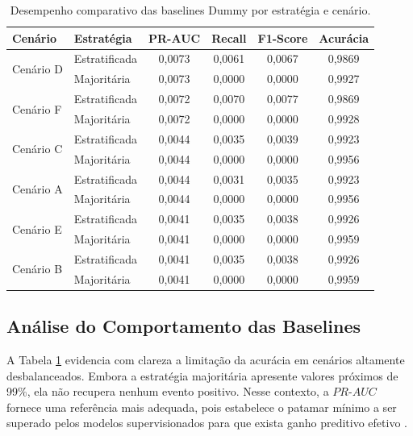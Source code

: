 \begin{table}[ht]
\centering
\caption{Desempenho comparativo das baselines Dummy por estratégia e cenário.}
\label{tab:resultados_dummies_completa}
\small
\begin{tabular}{llcccc}
\toprule
\textbf{Cenário} & \textbf{Estratégia} & \textbf{PR-AUC} & \textbf{Recall} & \textbf{F1-Score} & \textbf{Acurácia} \\
\midrule
\multirow{2}{*}{Cenário D} & Estratificada & 0,0073 & 0,0061 & 0,0067 & 0,9869 \\
                           & Majoritária   & 0,0073 & 0,0000 & 0,0000 & 0,9927 \\
\midrule
\multirow{2}{*}{Cenário F} & Estratificada & 0,0072 & 0,0070 & 0,0077 & 0,9869 \\
                           & Majoritária   & 0,0072 & 0,0000 & 0,0000 & 0,9928 \\
\midrule
\multirow{2}{*}{Cenário C} & Estratificada & 0,0044 & 0,0035 & 0,0039 & 0,9923 \\
                           & Majoritária   & 0,0044 & 0,0000 & 0,0000 & 0,9956 \\
\midrule
\multirow{2}{*}{Cenário A} & Estratificada & 0,0044 & 0,0031 & 0,0035 & 0,9923 \\
                           & Majoritária   & 0,0044 & 0,0000 & 0,0000 & 0,9956 \\
\midrule
\multirow{2}{*}{Cenário E} & Estratificada & 0,0041 & 0,0035 & 0,0038 & 0,9926 \\
                           & Majoritária   & 0,0041 & 0,0000 & 0,0000 & 0,9959 \\
\midrule
\multirow{2}{*}{Cenário B} & Estratificada & 0,0041 & 0,0035 & 0,0038 & 0,9926 \\
                           & Majoritária   & 0,0041 & 0,0000 & 0,0000 & 0,9959 \\
\bottomrule
\end{tabular}
\end{table}

\subsection{Análise do Comportamento das Baselines}

A Tabela \ref{tab:resultados_dummies_completa} evidencia com clareza a limitação da acurácia em cenários altamente desbalanceados. Embora a estratégia majoritária apresente valores próximos de 99\%, ela não recupera nenhum evento positivo. Nesse contexto, a $PR\text{-}AUC$ fornece uma referência mais adequada, pois estabelece o patamar mínimo a ser superado pelos modelos supervisionados para que exista ganho preditivo efetivo \cite{andrianarivony2024review}.

